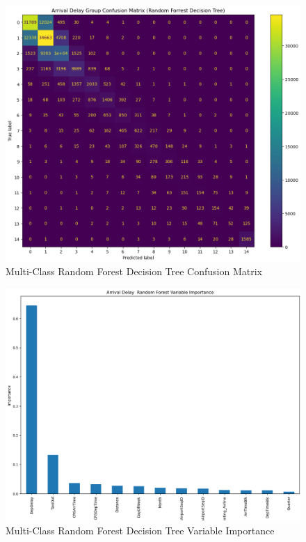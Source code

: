 \documentclass[a4paper,12pt]{article}
\begin{document}
\begin{figure}[!]
    \centering
    \includegraphics*[scale=.50]{../../img/model_rq1_cfmtrx_4.png}
    \caption[]{Multi-Class Random Forest Decision Tree Confusion Matrix}
    \label{fig:model:rq1:cfmtrx_4}
\end{figure}

\begin{figure}[!]
    \centering
    \includegraphics*[scale=.45]{../../img/model_rq1_rf.png}
    \caption[]{Multi-Class Random Forest Decision Tree Variable Importance}
    \label{fig:model:rq1:rfc_1}
\end{figure}
\end{document}
